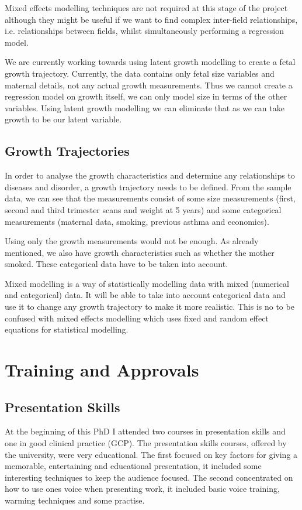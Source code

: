 \documentclass[bsc]{abdnthesis}
\begin{document}
Mixed effects modelling techniques are not required at this stage of the project although they might be useful if we want to find complex inter-field relationships, i.e. relationships between fields, whilst simultaneously performing a regression model. 

We are currently working towards using latent growth modelling \cite{ lavaan} to create a fetal growth trajectory. Currently, the data contains only fetal size variables and maternal details, not any actual growth measurements. Thus we cannot create a regression model on growth itself, we can only model size in terms of the other variables. Using latent growth modelling we can eliminate that as we can take growth to be our latent variable. 
\section{Growth Trajectories} %
\label{sec:growth_trajectories}
In order to analyse the growth characteristics and determine any relationships to diseases and disorder, a growth trajectory needs to be defined. From the sample data, we can see that the measurements consist of some size measurements (first, second and third trimester scans and weight at 5 years) and some categorical measurements (maternal data, smoking, previous asthma and economics). 


Using only the growth measurements would not be enough. As already mentioned, we also have growth characteristics such as whether the mother smoked. These categorical data have to be taken into account. 

Mixed modelling is a way of statistically modelling data with mixed (numerical and categorical) data. It will be able to take into account categorical data and use it to change any growth trajectory to make it more realistic. This is no to be confused with mixed effects modelling which uses fixed and random effect equations for statistical modelling. 

\chapter{Training and Approvals}
\section{Presentation Skills} %
\label{sec:presentation_skills}
At the beginning of this PhD I attended two courses in presentation skills and one in good clinical practice (GCP). The presentation skills courses, offered by the university, were very educational. The first focused on key factors for giving a memorable, entertaining and educational presentation, it included some interesting techniques to keep the audience focused. The second concentrated on how to use ones voice when presenting work, it included basic voice training, warming techniques and some practise. 
\end{document}
